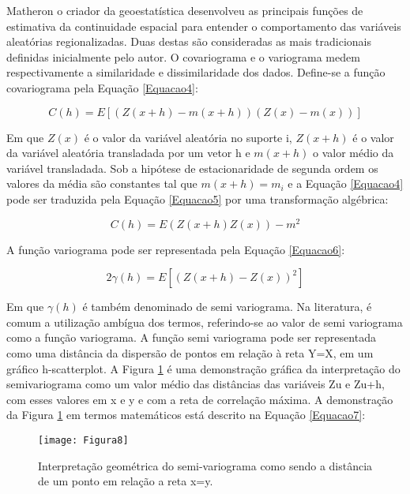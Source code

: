 Matheron o criador da geoestatística desenvolveu as principais funções de estimativa da continuidade espacial para entender o comportamento das variáveis aleatórias regionalizadas. Duas destas são consideradas as mais tradicionais definidas inicialmente pelo autor. O covariograma e o variograma medem respectivamente a similaridade e dissimilaridade dos dados. Define-se a função covariograma pela Equação \ref{Equacao4}:

\begin{equation}\label{Equacao4}
C(h) = E\left[ \left( Z(x+h) - m(x+h) \right) \left( Z(x) -m(x)\right) \right] 
\end{equation}

Em que $Z(x)$ é o valor da variável aleatória no suporte i, $Z(x+h)$ é o valor da variável aleatória transladada por um vetor h e $m(x+h)$ o valor médio da variável transladada. Sob a hipótese de estacionaridade de segunda ordem os valores da média são constantes tal que $m(x+h)=m_i$ e a Equação \ref{Equacao4}  pode ser traduzida pela Equação \ref{Equacao5} por uma transformação algébrica: 

\begin{equation}\label{Equacao5}
C(h) = E\left( Z(x+h)Z(x)\right)  -m^2
\end{equation}

A função variograma pode ser representada pela Equação \ref{Equacao6}:

\begin{equation}\label{Equacao6}
2\gamma(h) = E\left[ \left( Z(x+h)-Z(x)\right)^2\right] 
\end{equation}

Em que $\gamma(h)$ é também denominado de semi variograma. Na literatura, é comum a utilização ambígua dos termos, referindo-se ao valor de semi variograma como a função variograma. A função semi variograma pode ser representada como uma distância da dispersão de pontos em relação à reta Y=X, em um gráfico h-scatterplot.  A Figura \ref{Figura8} é uma demonstração gráfica da interpretação do semivariograma como um valor médio das distâncias das variáveis Zu e Zu+h, com esses valores em x e y e com a reta de correlação máxima. A demonstração da Figura \ref{Figura8} em termos matemáticos está descrito na Equação \ref{Equacao7}:

\begin{figure}[H]
	\centering
	\texttt{[image: Figura8]}
	\caption{Interpretação geométrica do semi-variograma como sendo a distância de um ponto em relação a reta x=y.}
	\label{Figura8}
\end{figure}

